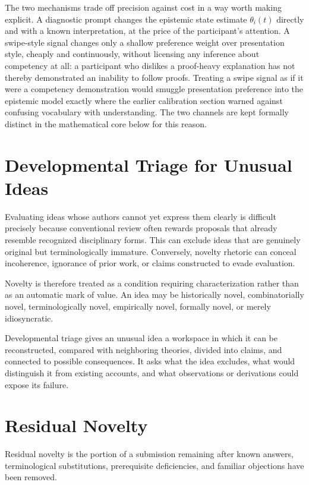 \documentclass[11pt]{article}
\begin{document}
The two mechanisms trade off precision against cost in a way worth making explicit. A diagnostic prompt changes the epistemic state estimate $\theta_i(t)$ directly and with a known interpretation, at the price of the participant's attention. A swipe-style signal changes only a shallow preference weight over presentation style, cheaply and continuously, without licensing any inference about competency at all: a participant who dislikes a proof-heavy explanation has not thereby demonstrated an inability to follow proofs. Treating a swipe signal as if it were a competency demonstration would smuggle presentation preference into the epistemic model exactly where the earlier calibration section warned against confusing vocabulary with understanding. The two channels are kept formally distinct in the mathematical core below for this reason.

\section{Developmental Triage for Unusual Ideas}

Evaluating ideas whose authors cannot yet express them clearly is difficult precisely because conventional review often rewards proposals that already resemble recognized disciplinary forms. This can exclude ideas that are genuinely original but terminologically immature. Conversely, novelty rhetoric can conceal incoherence, ignorance of prior work, or claims constructed to evade evaluation.

Novelty is therefore treated as a condition requiring characterization rather than as an automatic mark of value. An idea may be historically novel, combinatorially novel, terminologically novel, empirically novel, formally novel, or merely idiosyncratic.

Developmental triage gives an unusual idea a workspace in which it can be reconstructed, compared with neighboring theories, divided into claims, and connected to possible consequences. It asks what the idea excludes, what would distinguish it from existing accounts, and what observations or derivations could expose its failure.

\section{Residual Novelty}

Residual novelty is the portion of a submission remaining after known answers, terminological substitutions, prerequisite deficiencies, and familiar objections have been removed.
\end{document}
